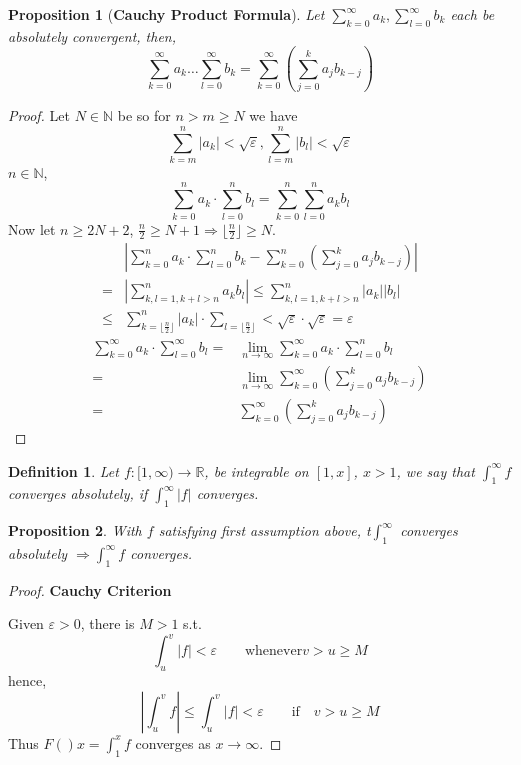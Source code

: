 \documentclass[12pt]{article}
\theoremstyle{plain}
\newtheorem{definition}{Definition}[subsection]
\newtheorem{proposition}{Proposition}[subsection]
\newcommand{\abs}[1]{\left| #1 \right|}
\newcommand{\floor}[1]{\lfloor #1 \rfloor}
\newcommand{\mN}{{\mathbb{N}}}
\newcommand{\mR}{{\mathbb{R}}}
\newcommand{\ep}{\varepsilon}
\begin{document}
\begin{proposition}[\textbf{Cauchy Product Formula}]
Let $\sum_{k=0}^{\infty} a_k, \sum_{l=0}^{\infty}b_k$ each be absolutely 
convergent, then,
\[
	\sum_{k=0}^{\infty} a_k \ldots \sum_{l=0}^{\infty}b_k
	= \sum_{k=0}^{\infty} (\sum_{j=0}^{k} a_jb_{k-j})
\]
\end{proposition}
\begin{proof}
	Let $N \in \mN$ be so for $n>m \geq N$ we have 
	\[
		\sum_{k=m}^n \abs{a_k} < \sqrt{\ep}, \sum_{l=m}^n \abs{b_l}<\sqrt{\ep}
	\]
	$n \in \mN$, 
	\[
		\sum_{k=0}^{n} a_k \cdot \sum_{l=0}^n b_l
		= \sum_{k=0}^n \sum_{l=0}^n a_kb_l
	\]
	Now let $n\geq 2N+2$, $\frac n2 \geq N+1\Rightarrow \floor{\frac n2}\geq N$.
	\begin{align*}
		& \abs{\sum_{k=0}^n a_k \cdot \sum_{l=0}^n b_k - \sum_{k=0}^{n}
		(\sum_{j=0}^k a_jb_{k-j})}	\\
		=& \abs{\sum_{k,l=1, k+l>n}^n a_kb_l}
		\leq \sum_{k,l=1, k+l>n}^n \abs{a_k}\abs{b_l}	\\
		\leq& \sum_{k=\floor{\frac n2}}^n \abs{a_k} \cdot 
		\sum_{l = \floor{\frac n2}} < \sqrt{\ep} \cdot \sqrt{\ep} = \ep
	\end{align*}
	\begin{align*}
		\sum_{k=0}^{\infty} a_k \cdot \sum_{l=0}^{\infty} b_l
		=& \lim_{n\to\infty} \sum_{k=0}^{\infty} a_k\cdot \sum_{l=0}^n b_l \\
		=& \lim_{n\to\infty} \sum_{k=0}^{\infty} (\sum_{j=0}^k a_j b_{k-j})	\\
		=& \sum_{k=0}^{\infty}(\sum_{j=0}^k a_j b_{k-j})
	\end{align*}
\end{proof}


\begin{definition}
	Let $f:[1,\infty) \to\mR$, be integrable on $[1,x]$, $x > 1$, we say that
	$\int_1^{\infty} f$ converges absolutely, if $\int_1^{\infty}\abs{f}$
	converges. \\
\end{definition}

\begin{proposition}
	With $f$ satisfying first assumption above, t$\int_1^{\infty}$ converges
	absolutely $\Rightarrow \int_1^{\infty} f$ converges. 
\end{proposition}
\begin{proof}\textbf{Cauchy Criterion}

	Given $\ep > 0$, there is $M > 1$ s.t. 
	\[
		\int_u^v \abs f < \ep \qquad 
		\text{whenever} v > u \geq M
	\]
	hence, 
	\[
		\abs{\int_u^v f} \leq \int_u^v \abs{f} < \ep
		\qquad 
		\text{if}
		\quad 
		v > u \geq M
	\]
	Thus $F()x = \int_1^x f$ converges as $x \to \infty$.
\end{proof}
\end{document}
